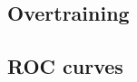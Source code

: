 %	
%	
	

\clearpage
\subsection{Overtraining}
\label{sec:overtraining}
\subsection{ROC curves}
\label{sec:ROC}
